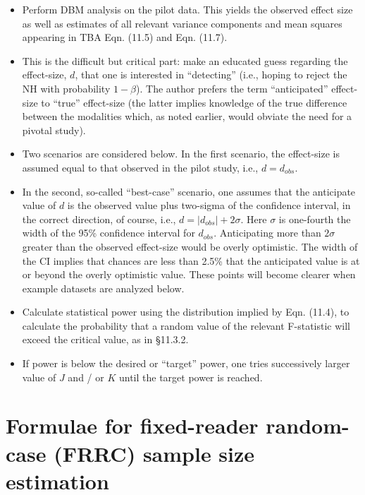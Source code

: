 \documentclass[
]{book}
\providecommand{\tightlist}{%
  \setlength{\itemsep}{0pt}\setlength{\parskip}{0pt}}
\begin{document}
\begin{itemize}
\tightlist
\item
  Perform DBM analysis on the pilot data. This yields the observed effect size as well as estimates of all relevant variance components and mean squares appearing in TBA Eqn. (11.5) and Eqn. (11.7).
\item
  This is the difficult but critical part: make an educated guess regarding the effect-size, \(d\), that one is interested in ``detecting'' (i.e., hoping to reject the NH with probability \(1-\beta\)). The author prefers the term ``anticipated'' effect-size to ``true'' effect-size (the latter implies knowledge of the true difference between the modalities which, as noted earlier, would obviate the need for a pivotal study).
\item
  Two scenarios are considered below. In the first scenario, the effect-size is assumed equal to that observed in the pilot study, i.e., \(d = d_{obs}\).
\item
  In the second, so-called ``best-case'' scenario, one assumes that the anticipate value of \(d\) is the observed value plus two-sigma of the confidence interval, in the correct direction, of course, i.e., \(d=\left | d_{obs} \right |+2\sigma\). Here \(\sigma\) is one-fourth the width of the 95\% confidence interval for \(d_{obs}\). Anticipating more than \(2\sigma\) greater than the observed effect-size would be overly optimistic. The width of the CI implies that chances are less than 2.5\% that the anticipated value is at or beyond the overly optimistic value. These points will become clearer when example datasets are analyzed below.
\item
  Calculate statistical power using the distribution implied by Eqn. (11.4), to calculate the probability that a random value of the relevant F-statistic will exceed the critical value, as in §11.3.2.
\item
  If power is below the desired or ``target'' power, one tries successively larger value of \(J\) and / or \(K\) until the target power is reached.
\end{itemize}

\hypertarget{RocSampleSizeDBM-FRRC-sample-size-estimation}{%
\section{Formulae for fixed-reader random-case (FRRC) sample size estimation}\label{RocSampleSizeDBM-FRRC-sample-size-estimation}}
\end{document}
